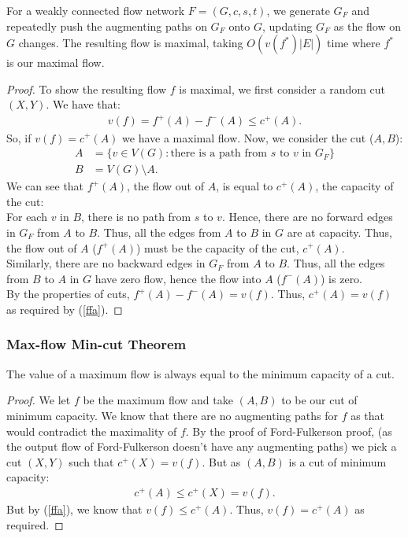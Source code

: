 For a weakly connected flow network $F = (G, c, s, t)$, we generate $G_F$ and
repeatedly push the augmenting paths on $G_F$ onto $G$, updating $G_F$
as the flow on $G$ changes. 
The resulting flow is maximal, taking $O(v(f^*)|E|)$ time where 
$f^*$ is our maximal flow.
\begin{proof}
  To show the resulting flow $f$ is maximal, we first consider a random
  cut $(X, Y)$. We have that: \begin{gather} \label{ffa}
    v(f) = f^+(A) - f^-(A) \leq c^+(A).
  \end{gather} So, if $v(f) = c^+(A)$ we have a maximal flow.
  Now, we consider the cut ($A, B$):
  \begin{align*}
    A &= \{v \in V(G) : \text{there is a path from $s$ to $v$ in } G_F\} \\
    B &= V(G) \setminus A.
  \end{align*} We can see that $f^+(A)$, the flow out of $A$, is equal to
  $c^+(A)$, the capacity of the cut:
  \\[\baselineskip]
  For each $v$ in $B$, there is no path from $s$ to $v$. Hence, there are
  no forward edges in $G_F$ from $A$ to $B$. Thus, all the edges from $A$ 
  to $B$ in $G$ are at capacity. Thus, the flow out of $A$ ($f^+(A)$) 
  must be the capacity of the cut, $c^+(A)$. 
  \\[\baselineskip]
  Similarly, there are no backward edges in $G_F$ from $A$ to $B$. Thus, 
  all the edges from $B$ to $A$ in $G$ have zero flow, hence the flow into 
  $A$ ($f^-(A)$) is zero.
  \\[\baselineskip]
  By the properties of cuts, $f^+(A) - f^-(A) = v(f)$. Thus,
  $c^+(A) = v(f)$ as required by (\ref{ffa}).
\end{proof}

\subsubsection{Max-flow Min-cut Theorem}

The value of a maximum flow is always equal to the minimum capacity of a cut.
\begin{proof}
  We let $f$ be the maximum flow and take $(A, B)$ to be our cut of minimum
  capacity.
  We know that there are no augmenting paths for $f$ as that would 
  contradict the maximality of $f$. By the proof of Ford-Fulkerson proof, 
  (as the output flow of Ford-Fulkerson doesn't have any augmenting paths)
  we pick a cut $(X, Y)$ such that $c^+(X) = v(f)$. But as $(A, B)$ is a
  cut of minimum capacity: \begin{gather*}
    c^+(A) \leq c^+(X) = v(f).
  \end{gather*} But by (\ref{ffa}), we know that $v(f) \leq c^+(A)$. Thus,
  $v(f) = c^+(A)$ as required.
\end{proof}

